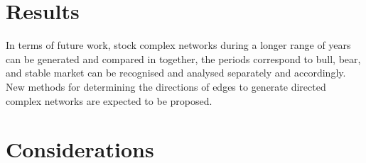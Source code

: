 \section{Results}
In terms of future work, stock complex networks during a longer range of years can be generated and compared in together, the periods correspond to bull, bear, and stable market can be recognised and analysed separately and accordingly. New methods for determining the directions of edges to generate directed complex networks are expected to be proposed.

\section{Considerations}
